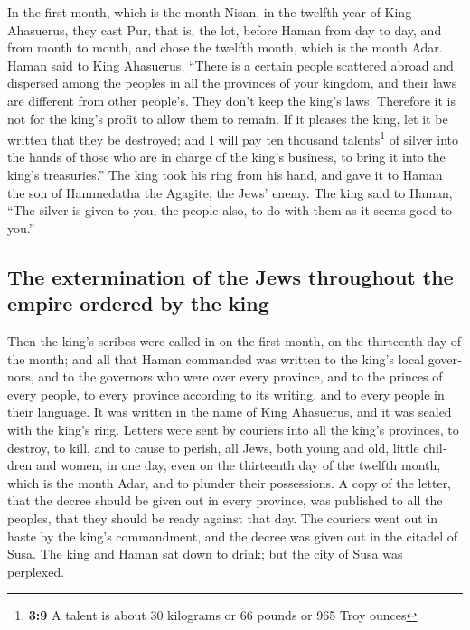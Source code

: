 \begin{paracol}{2}
\begin{otherlanguage}{english}
 In the first month, which is the month Nisan, in the
twelfth year of King Ahasuerus, they cast Pur, that is, the lot, before
Haman from day to day, and from month to month, and chose the twelfth
month, which is the month Adar.  Haman said to King
Ahasuerus, ``There is a certain people scattered abroad and dispersed
among the peoples in all the provinces of your kingdom, and their laws
are different from other people's. They don't keep the king's laws.
Therefore it is not for the king's profit to allow them to remain.
 If it pleases the king, let it be written that they be
destroyed; and I will pay ten thousand talents\footnote{\textbf{3:9} A
  talent is about 30 kilograms or 66 pounds or 965 Troy ounces} of
silver into the hands of those who are in charge of the king's business,
to bring it into the king's treasuries.''  The king took
his ring from his hand, and gave it to Haman the son of Hammedatha the
Agagite, the Jews' enemy.  The king said to Haman, ``The
silver is given to you, the people also, to do with them as it seems
good to you.''

\hypertarget{the-extermination-of-the-jews-throughout-the-empire-ordered-by-the-king}{%
\subsection{The extermination of the Jews throughout the empire ordered
by the
king}\label{the-extermination-of-the-jews-throughout-the-empire-ordered-by-the-king}}

 Then the king's scribes were called in on the first
month, on the thirteenth day of the month; and all that Haman commanded
was written to the king's local governors, and to the governors who were
over every province, and to the princes of every people, to every
province according to its writing, and to every people in their
language. It was written in the name of King Ahasuerus, and it was
sealed with the king's ring.  Letters were sent by
couriers into all the king's provinces, to destroy, to kill, and to
cause to perish, all Jews, both young and old, little children and
women, in one day, even on the thirteenth day of the twelfth month,
which is the month Adar, and to plunder their possessions.
 A copy of the letter, that the decree should be given
out in every province, was published to all the peoples, that they
should be ready against that day.  The couriers went out
in haste by the king's commandment, and the decree was given out in the
citadel of Susa. The king and Haman sat down to drink; but the city of
Susa was perplexed.


\end{otherlanguage}
\end{paracol}

